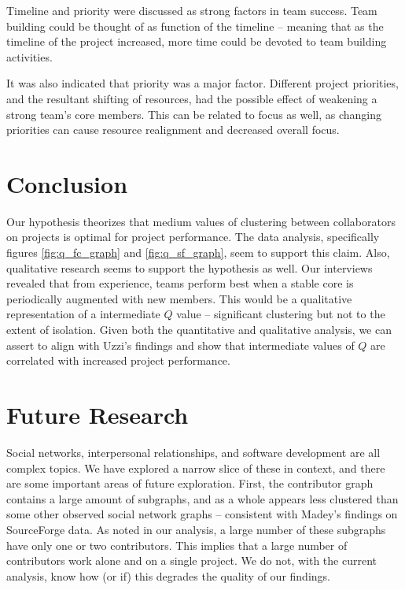 \documentclass{proc}
\begin{document}
Timeline and priority were discussed as strong factors in team success. Team building could be thought of as function of the timeline -- meaning that as the timeline of the project increased, more time could be devoted to team building activities.

It was also indicated that priority was a major factor. Different project priorities, and the resultant shifting of resources, had the possible effect of weakening a strong team's core members. This can be related to focus as well, as changing priorities can cause resource realignment and decreased overall focus.

\section{Conclusion}
Our hypothesis theorizes that medium values of clustering between collaborators on projects is optimal for project performance. The data analysis, specifically figures \ref{fig:q_fc_graph} and \ref{fig:q_sf_graph}, seem to support this claim. Also, qualitative research seems to support the hypothesis as well. Our interviews revealed that from experience, teams perform best when a stable core is periodically augmented with new members. This would be a qualitative representation of a intermediate $Q$ value -- significant clustering but not to the extent of isolation. Given both the quantitative and qualitative analysis, we can assert to align with Uzzi's findings\cite{uzzi2005collaboration} and show that intermediate values of $Q$ are correlated with increased project performance.

\section{Future Research}
Social networks, interpersonal relationships, and software development are all complex topics. We have explored a narrow slice of these in context, and there are some important areas of future exploration. First, the contributor graph contains a large amount of subgraphs, and as a whole appears less clustered than some other observed social network graphs -- consistent with Madey's findings\cite{madey2002open} on SourceForge data. As noted in our analysis, a large number of these subgraphs have only one or two contributors. This implies that a large number of contributors work alone and on a single project. We do not, with the current analysis, know how (or if) this degrades the quality of our findings.\\
\end{document}
